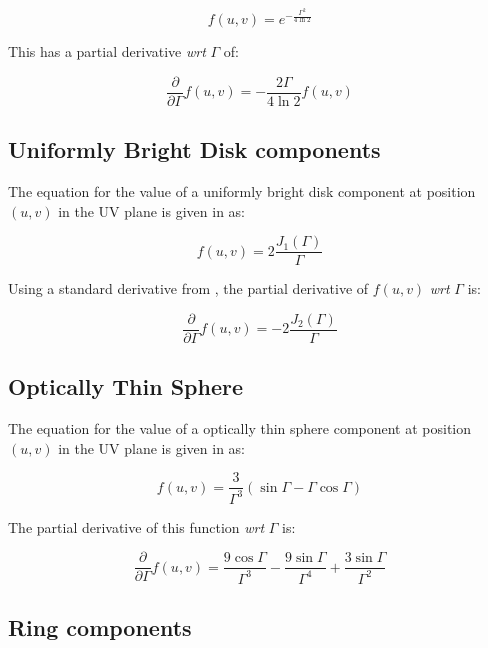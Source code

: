 \documentclass[11pt]{article}
\begin{document}
\begin{equation}
f(u,v) = e^{-\frac{\Gamma^{2}}{4\ln{2}}}
\end{equation}

This has a partial derivative {\em wrt} $\Gamma$ of:

\begin{equation}
\frac{\partial}{\partial\Gamma} f(u,v) = -\frac{2\Gamma}{4\ln{2}} f(u,v)
\end{equation}

\subsection{Uniformly Bright Disk components}

The equation for the value of a uniformly bright disk component at
position $(u,v)$ in the UV plane is given in \cite{tjp91} as:

\begin{equation}
f(u,v) = 2 \frac{J_{1}(\Gamma)}{\Gamma}
\end{equation}

Using a standard derivative from \cite{handbook}, the partial
derivative of $f(u,v)$ {\em wrt} $\Gamma$ is:

\begin{equation}
\frac{\partial}{\partial\Gamma} f(u,v) = -2 \frac{J_{2}(\Gamma)}{\Gamma}
\end{equation}

\subsection{Optically Thin Sphere}

The equation for the value of a optically thin sphere component at
position $(u,v)$ in the UV plane is given in \cite{tjp91} as:

\begin{equation}
f(u,v) = \frac{3}{\Gamma^{3}}(\sin{\Gamma} - \Gamma \cos{\Gamma})
\end{equation}

The partial derivative of this function {\em wrt} $\Gamma$ is:

\begin{equation}
\frac{\partial}{\partial\Gamma} f(u,v) =
\frac{9\cos{\Gamma}}{\Gamma^{3}} -
\frac{9\sin{\Gamma}}{\Gamma^{4}} +
\frac{3\sin{\Gamma}}{\Gamma^{2}}
\end{equation}

\subsection{Ring components}
\end{document}
